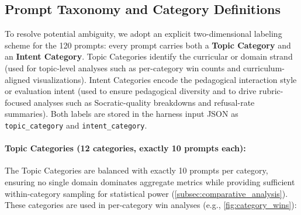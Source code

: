 \subsection{Prompt Taxonomy and Category Definitions}
\label{app:prompts_taxonomy}

To resolve potential ambiguity, we adopt an explicit two-dimensional labeling scheme for the 120 prompts: every prompt carries both a \textbf{Topic Category} and an \textbf{Intent Category}. Topic Categories identify the curricular or domain strand (used for topic-level analyses such as per-category win counts and curriculum-aligned visualizations). Intent Categories encode the pedagogical interaction style or evaluation intent (used to ensure pedagogical diversity and to drive rubric-focused analyses such as Socratic-quality breakdowns and refusal-rate summaries). Both labels are stored in the harness input JSON as \texttt{topic\_category} and \texttt{intent\_category}.

\paragraph{Topic Categories (12 categories, exactly 10 prompts each):} The Topic Categories are balanced with exactly 10 prompts per category, ensuring no single domain dominates aggregate metrics while providing sufficient within-category sampling for statistical power (\cref{subsec:comparative_analysis}). These categories are used in per-category win analyses (e.g., \cref{fig:category_wins}):

